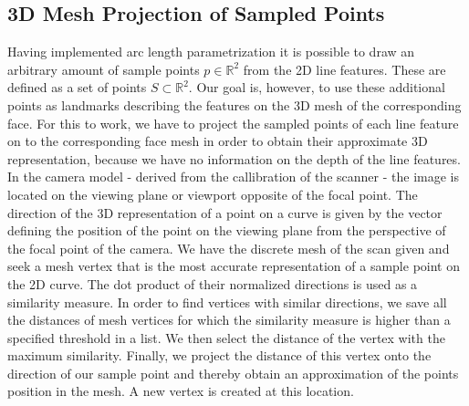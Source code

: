 \subsection{3D Mesh Projection of Sampled Points}
Having implemented arc length parametrization it is possible to draw an arbitrary amount of sample points $p \in \mathbb{R}^2$ from the 2D line features. These are defined as a set of points $S \subset \mathbb{R}^2$. Our goal is, however, to use these additional points as landmarks describing the features on the 3D mesh of the corresponding face. For this to work, we have to project the sampled points of each line feature on to the corresponding face mesh in order to obtain their approximate 3D representation, because we have no information on the depth of the line features.  
In the camera model - derived from the callibration of the scanner - the image is located on the viewing plane or viewport opposite of the focal point. The direction of the 3D representation of a point on a curve is given by the vector defining the position of the point on the viewing plane from the perspective of the focal point of the camera. We have the discrete mesh of the scan given and seek a mesh vertex that is the most accurate representation of a sample point on the 2D
curve. The dot product of their normalized directions is used as a similarity measure. In order to find vertices with similar directions, we save all the distances of mesh vertices for which the similarity measure is higher than a specified threshold in a list. We then select the distance of the vertex with the maximum similarity.
Finally, we project the distance of this vertex onto the direction of our sample point and thereby obtain an approximation of the points position in the mesh. A new vertex is created at this location. %
